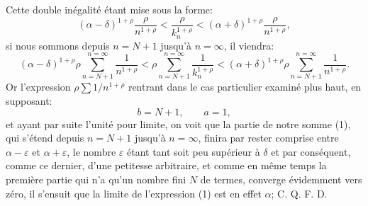 \documentclass[11pt]{article}
\begin{document}
Cette double inégalité étant mise sous la forme:
\[
(\alpha-\delta)^{1+\rho}\frac{\rho}{n^{1+\rho}}
<
\frac{\rho}{k_n^{1+\rho}}
<
(\alpha+\delta)^{1+\rho}\frac{\rho}{n^{1+\rho}},
\]
si nous sommons depuis \(n=N+1\) jusqu'à \(n=\infty\), il viendra:
\[
(\alpha-\delta)^{1+\rho}\rho\sum_{n=N+1}^{n=\infty}\frac{1}{n^{1+\rho}}
<
\rho\sum_{n=N+1}^{n=\infty}\frac{1}{k_n^{1+\rho}}
<
(\alpha+\delta)^{1+\rho}\rho\sum_{n=N+1}^{n=\infty}\frac{1}{n^{1+\rho}}.
\]
Or l'expression \(\rho\sum 1/n^{1+\rho}\) rentrant dans le cas particulier examiné plus haut, en supposant:
\[
b=N+1,\qquad a=1,
\]
et ayant par suite l'unité pour limite, on voit que la partie de notre somme (1), qui s'étend depuis \(n=N+1\) jusqu'à \(n=\infty\), finira par rester comprise entre \(\alpha-\varepsilon\) et \(\alpha+\varepsilon\), le nombre \(\varepsilon\) étant tant soit peu supérieur à \(\delta\) et par conséquent, comme ce dernier, d'une petitesse arbitraire, et comme en même temps la première partie qui n'a qu'un nombre fini \(N\) de termes, converge évidemment vers zéro, il s'ensuit que la limite de l'expression (1) est en effet \(\alpha\); C. Q. F. D.
\end{document}
